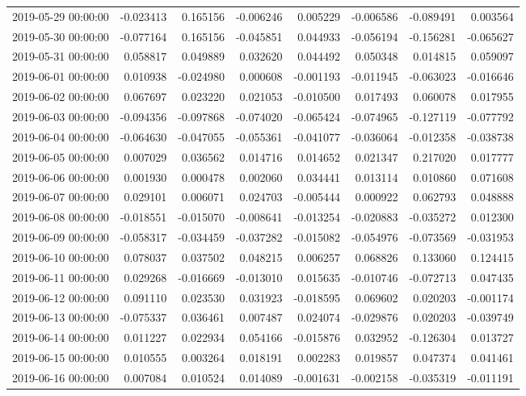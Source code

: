 \begin{tabular}{lrrrrrrr}
2019-05-29 00:00:00 & -0.023413 & 0.165156 & -0.006246 & 0.005229 & -0.006586 & -0.089491 & 0.003564 \\
2019-05-30 00:00:00 & -0.077164 & 0.165156 & -0.045851 & 0.044933 & -0.056194 & -0.156281 & -0.065627 \\
2019-05-31 00:00:00 & 0.058817 & 0.049889 & 0.032620 & 0.044492 & 0.050348 & 0.014815 & 0.059097 \\
2019-06-01 00:00:00 & 0.010938 & -0.024980 & 0.000608 & -0.001193 & -0.011945 & -0.063023 & -0.016646 \\
2019-06-02 00:00:00 & 0.067697 & 0.023220 & 0.021053 & -0.010500 & 0.017493 & 0.060078 & 0.017955 \\
2019-06-03 00:00:00 & -0.094356 & -0.097868 & -0.074020 & -0.065424 & -0.074965 & -0.127119 & -0.077792 \\
2019-06-04 00:00:00 & -0.064630 & -0.047055 & -0.055361 & -0.041077 & -0.036064 & -0.012358 & -0.038738 \\
2019-06-05 00:00:00 & 0.007029 & 0.036562 & 0.014716 & 0.014652 & 0.021347 & 0.217020 & 0.017777 \\
2019-06-06 00:00:00 & 0.001930 & 0.000478 & 0.002060 & 0.034441 & 0.013114 & 0.010860 & 0.071608 \\
2019-06-07 00:00:00 & 0.029101 & 0.006071 & 0.024703 & -0.005444 & 0.000922 & 0.062793 & 0.048888 \\
2019-06-08 00:00:00 & -0.018551 & -0.015070 & -0.008641 & -0.013254 & -0.020883 & -0.035272 & 0.012300 \\
2019-06-09 00:00:00 & -0.058317 & -0.034459 & -0.037282 & -0.015082 & -0.054976 & -0.073569 & -0.031953 \\
2019-06-10 00:00:00 & 0.078037 & 0.037502 & 0.048215 & 0.006257 & 0.068826 & 0.133060 & 0.124415 \\
2019-06-11 00:00:00 & 0.029268 & -0.016669 & -0.013010 & 0.015635 & -0.010746 & -0.072713 & 0.047435 \\
2019-06-12 00:00:00 & 0.091110 & 0.023530 & 0.031923 & -0.018595 & 0.069602 & 0.020203 & -0.001174 \\
2019-06-13 00:00:00 & -0.075337 & 0.036461 & 0.007487 & 0.024074 & -0.029876 & 0.020203 & -0.039749 \\
2019-06-14 00:00:00 & 0.011227 & 0.022934 & 0.054166 & -0.015876 & 0.032952 & -0.126304 & 0.013727 \\
2019-06-15 00:00:00 & 0.010555 & 0.003264 & 0.018191 & 0.002283 & 0.019857 & 0.047374 & 0.041461 \\
2019-06-16 00:00:00 & 0.007084 & 0.010524 & 0.014089 & -0.001631 & -0.002158 & -0.035319 & -0.011191 \\

\end{tabular}
